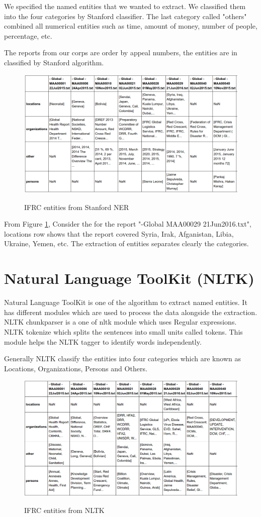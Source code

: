We specified the named entities that we wanted to extract. We classified them into the four categories by Stanford classifier.  The last category called "others" combined all numerical entities such as time, amount of money, number of people, percentage, etc. 

The reports from our corps are order by appeal numbers, the entities are in classified by Stanford algorithm. 

\begin{figure}[hbtp]
\caption{IFRC entities from Stanford NER}
\centering\includegraphics[scale =.45]{images/stanford.png} \label{stanford}
\end{figure}
From Figure \ref{stanford},  Consider the for the report "-Global MAA00029 21Jun2016.txt", locations row  shows that the report covered Syria, Irak, Afganistan, Libia, Ukraine, Yemen, etc.
The extraction of entities separates clearly the categories.
\section{Natural Language ToolKit (NLTK)}
Natural Language ToolKit is one of the algorithm to extract named  entities. It has different modules which are used to process the data alongside the extraction.
NLTK chunkparser is a one of nltk module  which uses Regular expressions. NLTK tokenize which splits the sentences into small units called tokens. This module helps the NLTK tagger to identify words independently. 

Generally NLTK classify the entities into four categories which are known as Locations, Organizations, Persons and Others.

\begin{figure}[hbtp]
\caption{IFRC entities from NLTK}
\centering
\includegraphics[scale=.45]{images/nltkalgo.png}\label{nltkalgo}
\end{figure}

